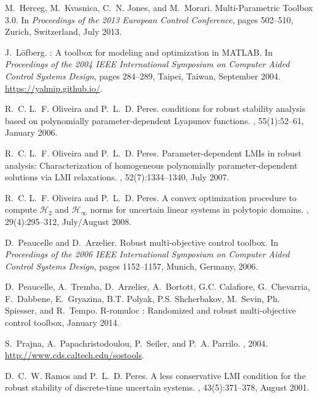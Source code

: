 \documentclass[english,11pt]{article}
\theoremstyle{break} \theorembodyfont{\small\rm}
\begin{document}
\begin{thebibliography}{10}
M.~Herceg, M.~Kvasnica, C.~N. Jones, and M.~Morari.
\newblock Multi-{P}arametric {T}oolbox 3.0.
\newblock In {\em Proceedings of the 2013 European Control Conference}, pages
  502--510, Zurich, Switzerland, July 2013.

J.~L{\"o}fberg.
: {A} toolbox for modeling and optimization in {MATLAB}.
\newblock In {\em Proceedings of the 2004 IEEE International Symposium on
  Computer Aided Control Systems Design}, pages 284--289, Taipei, Taiwan,
  September 2004.
\newblock \url{https://yalmip.github.io/}.

R.~C. L.~F. Oliveira and P.~L.~D. Peres.
 conditions for robust stability analysis based on polynomially
  parameter-dependent {L}yapunov functions.
, 55(1):52--61, January 2006.

R.~C. L.~F. Oliveira and P.~L.~D. Peres.
\newblock Parameter-dependent {LMI}s in robust analysis: {C}haracterization of
  homogeneous polynomially parameter-dependent solutions via {LMI} relaxations.
, 52(7):1334--1340, July
  2007.

R.~C. L.~F. Oliveira and P.~L.~D. Peres.
\newblock A convex optimization procedure to compute {${\mathcal{H}}_{2}$} and
  {${\mathcal{H}}_{\infty}$} norms for uncertain linear systems in polytopic
  domains.
, 29(4):295--312,
  July/August 2008.

D.~Peaucelle and D.~Arzelier.
\newblock Robust multi-objective control toolbox.
\newblock In {\em Proceedings of the 2006 IEEE International Symposium on
  Computer Aided Control Systems Design}, pages 1152--1157, Munich, Germany,
  2006.

D.~Peaucelle, A.~Tremba, D.~Arzelier, A.~Bortott, G.C. Calafiore, G.~Chevarria,
  F.~Dabbene, E.~Gryazina, B.T. Polyak, P.S. Shcherbakov, M.~Sevin, Ph.
  Spiesser, and R.~Tempo.
\newblock R-romuloc : Randomized and robust multi-objective control toolbox,
  January 2014.

S.~Prajna, A.~Papachristodoulou, P.~Seiler, and P.~A. Parrilo.
,
  2004.
\newblock \url{http://www.cds.caltech.edu/sostools}.

D.~C.~W. Ramos and P.~L.~D. Peres.
\newblock A less conservative {LMI} condition for the robust stability of
  discrete-time uncertain systems.
, 43(5):371--378, August 2001.


\end{thebibliography}
\end{document}
